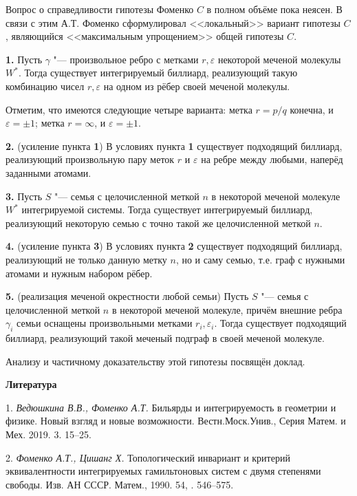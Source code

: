 Вопрос о справедливости гипотезы Фоменко $C$ в полном объёме пока неясен. В связи с этим А.Т. Фоменко сформулировал <<локальный>> вариант гипотезы $C$, являющийся <<максимальным упрощением>> общей гипотезы $C$.

\textbf{1.} Пусть $\gamma$ "--- произвольное ребро с метками $r, \varepsilon$ некоторой меченой молекулы $W^{*}$. Тогда существует интегрируемый биллиард, реализующий такую комбинацию чисел $r, \varepsilon$ на одном из рёбер своей меченой молекулы.

Отметим, что имеются следующие четыре варианта: метка $r = p \slash q$ конечна, и $\varepsilon = \pm 1$; метка $r = \infty$, и $\varepsilon = \pm 1$.

\textbf{2. } (усиление пункта \textbf{1}) В условиях пункта \textbf{1} существует подходящий биллиард, реализующий произвольную пару меток $r$ и $\varepsilon$ на ребре между любыми, наперёд заданными атомами.

\textbf{3.} Пусть $S$ "--- семья с целочисленной меткой $n$ в некоторой меченой молекуле $W^{*}$ интегрируемой системы. Тогда существует интегрируемый биллиард, реализующий некоторую семью с точно такой же целочисленной меткой $n$.

\textbf{4. } (усиление пункта \textbf{3}) В условиях пункта \textbf{2} существует подходящий биллиард, реализующий не только данную метку $n$, но и саму семью, т.е. граф с нужными атомами и нужным набором рёбер.

\textbf{5. } (реализация меченой окрестности любой семьи) Пусть $S$ "--- семья с целочисленной меткой $n$ в некоторой меченой молекуле, причём внешние ребра $\gamma_i$ семьи оснащены произвольными метками $r_i, \varepsilon_i$. Тогда существует подходящий биллиард, реализующий такой меченый подграф в своей меченой молекуле.


Анализу и частичному доказательству этой гипотезы посвящён доклад.




\smallskip \centerline {\bf Литература} \nopagebreak

1. {\it Ведюшкина В.В., Фоменко А.Т.} Бильярды и интегрируемость в геометрии и физике. Новый взгляд и новые возможности. Вестн.Моск.Унив., Серия Матем. и Мех. 2019. 3. 15--25.

2. {\it Фоменко А.Т., Цишанг Х.} Топологический инвариант и критерий
эквивалентности интегрируемых гамильтоновых систем с двумя степенями
свободы. Изв. АН СССР. Матем.,
1990. 54, .
 546--575.

